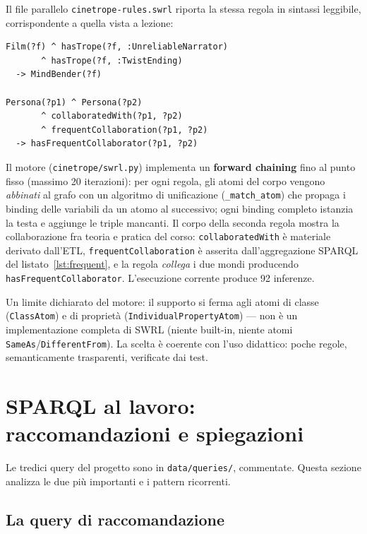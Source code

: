 \documentclass[a4paper,11pt]{article}
\newcommand{\code}[1]{\texttt{#1}}
\begin{document}
Il file parallelo \code{cinetrope-rules.swrl} riporta la stessa regola in
sintassi leggibile, corrispondente a quella vista a lezione:

\begin{lstlisting}[style=txt, caption={La stessa regola in sintassi
SWRL leggibile.}]
Film(?f) ^ hasTrope(?f, :UnreliableNarrator)
       ^ hasTrope(?f, :TwistEnding)
  -> MindBender(?f)

Persona(?p1) ^ Persona(?p2)
       ^ collaboratedWith(?p1, ?p2)
       ^ frequentCollaboration(?p1, ?p2)
  -> hasFrequentCollaborator(?p1, ?p2)
\end{lstlisting}

Il motore (\code{cinetrope/swrl.py}) implementa un \textbf{forward
chaining} fino al punto fisso (massimo 20 iterazioni): per ogni regola,
gli atomi del corpo vengono \emph{abbinati} al grafo con un algoritmo di
unificazione (\code{\_match\_atom}) che propaga i binding delle variabili
da un atomo al successivo; ogni binding completo istanzia la testa e
aggiunge le triple mancanti. Il corpo della seconda regola mostra la
collaborazione fra teoria e pratica del corso: \code{collaboratedWith} \`e
materiale derivato dall'ETL, \code{frequentCollaboration} \`e asserita
dall'aggregazione SPARQL del listato~\ref{lst:frequent}, e la regola
\emph{collega} i due mondi producendo \code{hasFrequentCollaborator}.
L'esecuzione corrente produce 92 inferenze.

Un limite dichiarato del motore: il supporto si ferma agli atomi di classe
(\code{ClassAtom}) e di propriet\`a (\code{IndividualPropertyAtom}) --- non
\`e un implementazione completa di SWRL (niente built-in, niente atomi
\code{SameAs}/\code{DifferentFrom}). La scelta \`e coerente con l'uso
didattico: poche regole, semanticamente trasparenti, verificate dai test.

\section{SPARQL al lavoro: raccomandazioni e spiegazioni}\label{sec:sparql}

Le tredici query del progetto sono in \code{data/queries/}, commentate.
Questa sezione analizza le due pi\`u importanti e i pattern ricorrenti.

\subsection{La query di raccomandazione}
\end{document}
